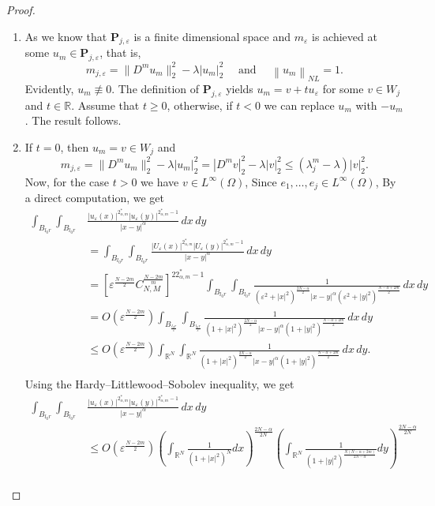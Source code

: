 \documentclass[reqno]{amsart}
\newcommand{\la} {\lambda}
\newcommand{\eps}{\varepsilon}
\newcommand{\Om}{\Omega}
\newcommand{\al} {\alpha}
\newcommand{\noi} {  \noindent}
\newcommand{\mb} {\mathbb}
\numberwithin{theorem}{section} \numberwithin{equation}{section}
\begin{document}
\begin{proof}
\noi \begin{enumerate}
\item As we know that $\mathbf{P}_{j, \eps}$ is a finite dimensional space and $m_{\eps}$ is achieved at some $u_m \in \mathbf{P}_{j, \eps}$, that is,
\[m_{j, \eps}=\|D^m u_m\|_2^2-\la\left|u_m\right|_2^2 \quad \text { and } \quad\left\|u_m\right\|_{NL}=1.\]
Evidently, $u_m \not \equiv 0$. The definition of $\mathbf{P}_{j, \eps}$ yields
$u_m=v+t u_{\eps}$ for some $v \in {W}_j$ and $t \in \mb{R}$. Assume that $t \geq 0$, otherwise, if $t<0$ we can replace $u_m$ with $-u_m$. The result follows.
\item If $t=0$, then $u_m=v \in {W}_j$ and
\[m_{j,\eps}=\|D^{m}u_m\|_2^2-\la\left|u_m\right|_2^2=|D^{m}v|_2^2-\la|v|_2^2 \leq\left(\la^m_j-\la\right)|v|_2^2.\]
Now, for the case $t>0$ we have $v \in L^{\infty}(\Om)$, Since $e_1, \ldots, e_j \in L^{\infty}(\Om)$, By a direct computation, we get
\begin{align*}
\int_{B_{l_0 r}} \int_{B_{l_0 r}} &\frac{|u_{\eps}(x)|^{2_{\al, m}^*}|u_{\eps}(y)|^{2_{\al, m}^*-1}}{|x-y|^\al} \, dx \, dy \\
& =\int_{B_{l_0r}} \int_{B_{l_0r}}  \frac{|U_{\eps}(x)|^{2_{\al, m}^*}|U_{\eps}(y)|^{2_{\al, m}^*-1}}{|x-y|^\al} \, dx \, dy \\
&=[\eps^{\frac{N-2m}{2}}C_{N,M}^{\frac{N-2m}{m}}]^{22_{\al, m}^*-1} \int_{B_{l_0r}} \int_ {B_{l_0r}}\frac{1}{({\eps}^2+|x|^2)^{\frac{2N-\al}{2}}|x-y|^\al({\eps}^2+|y|^2)^{\frac{N-\al+2m}{2}}} \, dx \, dy \\
&= O\left(\eps^{\frac{N-2m}{2}}\right) \int_{B_{\frac{l_0r}{\eps}}} \int_ {B_{\frac{l_0r}{\eps}}}\frac{1}{(1+|x|^2)^{\frac{2N-\al}{2}}|x-y|^\al(1+|y|^2)^{\frac{N-\al+2m}{2}}} \, dx \, dy \\ 
& \leq O\left(\eps^{\frac{N-2m}{2}}\right) \int_{\mb{R}^N} \int_{\mb{R}^N} \frac{1}{(1+|x|^2)^{\frac{2N-\al}{2}}|x-y|^\al(1+|y|^2)^{\frac{N-\al+2m}{2}}} \, dx \, dy. \\
\end{align*}
Using the Hardy--Littlewood--Sobolev inequality, we get
\begin{align*}
\int_{B_{l_0r}} \int_{B_{l_0r}}& \frac{|u_{\eps}(x)|^{2_{\al, m}^*}|u_{\eps}(y)|^{2_{\al, m}^*-1}}{|x-y|^\al}\, dx \, dy \\
&\leq O\left(\eps^{\frac{N-2m}{2}}\right) \left(\int_{\mb{R}^N} \frac{1}{\left(1+|x|^2\right)^N}dx\right)^{\frac{2N-\al}{2N}}\left(\int_{\mb{R}^N}\frac{1}{\left(1+|y|^2\right)^{\frac{N(N-\al+2m)}{2N-\al}}} d y \right)^{\frac{2N-\al}{2N}}\\

\end{align*}
\end{enumerate}
\end{proof}
\end{document}
